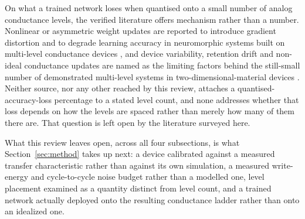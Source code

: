 On what a trained network loses when quantised onto a small number of analog conductance
levels, the verified literature offers mechanism rather than a number. Nonlinear or
asymmetric weight updates are reported to introduce gradient distortion and to degrade
learning accuracy in neuromorphic systems built on multi-level conductance devices
\cite{Kumar2026_Nanomaterials}, and device variability, retention drift and non-ideal
conductance updates are named as the limiting factors behind the still-small number of
demonstrated multi-level systems in two-dimensional-material devices
\cite{Kazmi2026_NanoMicroLett}. Neither source, nor any other reached by this review,
attaches a quantised-accuracy-loss percentage to a stated level count, and none addresses
whether that loss depends on how the levels are spaced rather than merely how many of
them there are. That question is left open by the literature surveyed here.

What this review leaves open, across all four subsections, is what Section~\ref{sec:method}
takes up next: a device calibrated against a measured transfer characteristic rather than
against its own simulation, a measured write-energy and cycle-to-cycle noise budget rather
than a modelled one, level placement examined as a quantity distinct from level count, and
a trained network actually deployed onto the resulting conductance ladder rather than onto
an idealized one.

